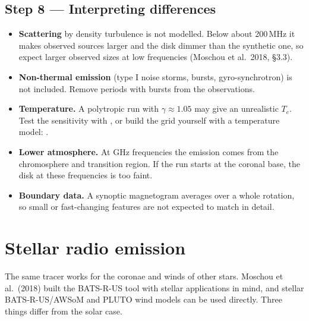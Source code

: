 \section*{Step 8 --- Interpreting differences}
\begin{itemize}[itemsep=2pt]
\item \textbf{Scattering} by density turbulence is not modelled. Below about 200\,MHz it
      makes observed sources larger and the disk dimmer than the synthetic one, so expect
      larger observed sizes at low frequencies (Moschou et al.\ 2018, \S3.3).
\item \textbf{Non-thermal emission} (type I noise storms, bursts, gyro-synchrotron) is not
      included. Remove periods with bursts from the observations.
\item \textbf{Temperature.} A polytropic run with $\gamma\approx1.05$ may give an
      unrealistic $T_e$. Test the sensitivity with , or build the grid
      yourself with a temperature model:
      .
\item \textbf{Lower atmosphere.} At GHz frequencies the emission comes from the
      chromosphere and transition region. If the run starts at the coronal base, the disk
      at these frequencies is too faint.
\item \textbf{Boundary data.} A synoptic magnetogram averages over a whole rotation, so
      small or fast-changing features are not expected to match in detail.
\end{itemize}

\chapter{Stellar radio emission}\label{chap:stellar}

The same tracer works for the coronae and winds of other stars. Moschou et al.\ (2018) built
the BATS-R-US tool with stellar applications in mind, and stellar BATS-R-US/AWSoM and PLUTO
wind models can be used directly. Three things differ from the solar case.

